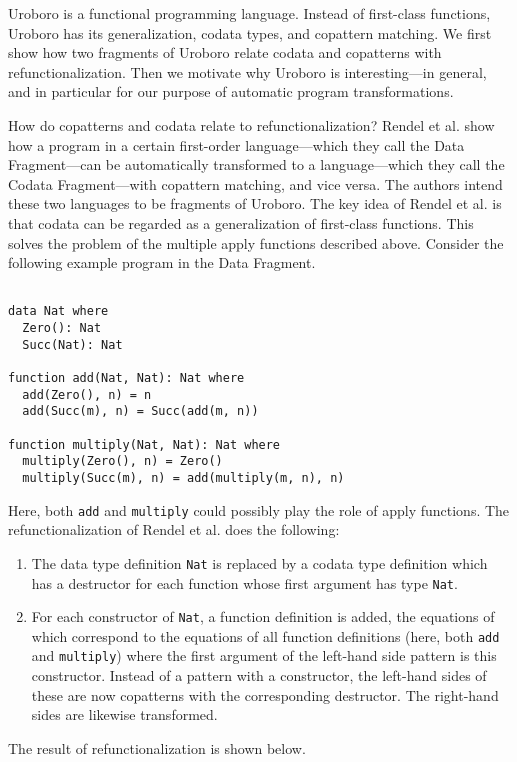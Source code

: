Uroboro is a functional programming language. Instead of first-class functions, Uroboro has its generalization, codata types, and copattern matching. We first show how two fragments of Uroboro relate codata and copatterns with refunctionalization. Then we motivate why Uroboro is interesting---in general, and in particular for our purpose of automatic program transformations.

How do copatterns and codata relate to refunctionalization? Rendel et al.\cite{rendel15automatic} show how a program in a certain first-order language---which they call the Data Fragment---can be automatically transformed to a language---which they call the Codata Fragment---with copattern matching, and vice versa. The authors intend these two languages to be fragments of Uroboro. The key idea of Rendel et al. is that codata can be regarded as a generalization of first-class functions. This solves the problem of the multiple apply functions described above. Consider the following example program in the Data Fragment.

\begin{lstlisting}

data Nat where
  Zero(): Nat
  Succ(Nat): Nat

function add(Nat, Nat): Nat where
  add(Zero(), n) = n
  add(Succ(m), n) = Succ(add(m, n))

function multiply(Nat, Nat): Nat where
  multiply(Zero(), n) = Zero()
  multiply(Succ(m), n) = add(multiply(m, n), n)

\end{lstlisting}

Here, both \texttt{add} and \texttt{multiply} could possibly play the role of apply functions. The refunctionalization of Rendel et al. does the following:
\begin{enumerate}
\item The data type definition \texttt{Nat} is replaced by a codata type definition which has a destructor for each function whose first argument has type \texttt{Nat}.
\item For each constructor of \texttt{Nat}, a function definition is added, the equations of which correspond to the equations of all function definitions (here, both \texttt{add} and \texttt{multiply}) where the first argument of the left-hand side pattern is this constructor. Instead of a pattern with a constructor, the left-hand sides of these are now copatterns with the corresponding destructor. The right-hand sides are likewise transformed.
\end{enumerate}
The result of refunctionalization is shown below.

